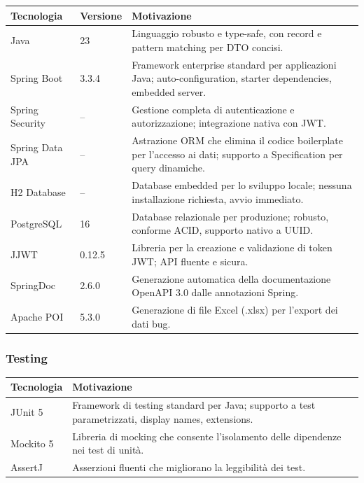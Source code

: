 \begin{center}
\small
\begin{tabular}{|l|l|p{6cm}|}
\hline
\textbf{Tecnologia} & \textbf{Versione} & \textbf{Motivazione} \\
\hline
Java & 23 & Linguaggio robusto e type-safe, con record e pattern matching per DTO concisi. \\
\hline
Spring Boot & 3.3.4 & Framework enterprise standard per applicazioni Java; auto-configuration, starter dependencies, embedded server. \\
\hline
Spring Security & -- & Gestione completa di autenticazione e autorizzazione; integrazione nativa con JWT. \\
\hline
Spring Data JPA & -- & Astrazione ORM che elimina il codice boilerplate per l'accesso ai dati; supporto a Specification per query dinamiche. \\
\hline
H2 Database & -- & Database embedded per lo sviluppo locale; nessuna installazione richiesta, avvio immediato. \\
\hline
PostgreSQL & 16 & Database relazionale per produzione; robusto, conforme ACID, supporto nativo a UUID. \\
\hline
JJWT & 0.12.5 & Libreria per la creazione e validazione di token JWT; API fluente e sicura. \\
\hline
SpringDoc & 2.6.0 & Generazione automatica della documentazione OpenAPI 3.0 dalle annotazioni Spring. \\
\hline
Apache POI & 5.3.0 & Generazione di file Excel (.xlsx) per l'export dei dati bug. \\
\hline
\end{tabular}
\end{center}

\subsubsection{Testing}

\begin{center}
\small
\begin{tabular}{|l|p{10cm}|}
\hline
\textbf{Tecnologia} & \textbf{Motivazione} \\
\hline
JUnit 5 & Framework di testing standard per Java; supporto a test parametrizzati, display names, extensions. \\
\hline
Mockito 5 & Libreria di mocking che consente l'isolamento delle dipendenze nei test di unità. \\
\hline
AssertJ & Asserzioni fluenti che migliorano la leggibilità dei test. \\
\hline
\end{tabular}
\end{center}


